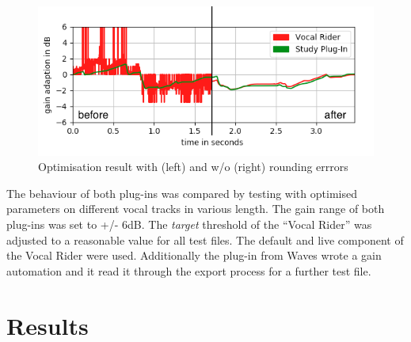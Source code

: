\begin{figure}[H]
\includegraphics[width=\textwidth]{images/afterSmooth}
\caption{Optimisation result with (left) and w/o (right) rounding errrors}
\end{figure}

The behaviour of both plug-ins was compared by testing with optimised parameters on different vocal tracks in various length. The gain range of both plug-ins was set to +/- 6dB. The \textit{target} threshold of the “Vocal Rider” was adjusted to a reasonable value for all test files. The default and live component of the Vocal Rider were used. Additionally the plug-in from Waves wrote a gain automation and it read it through the export process for a further test file.\\

\section{Results}

